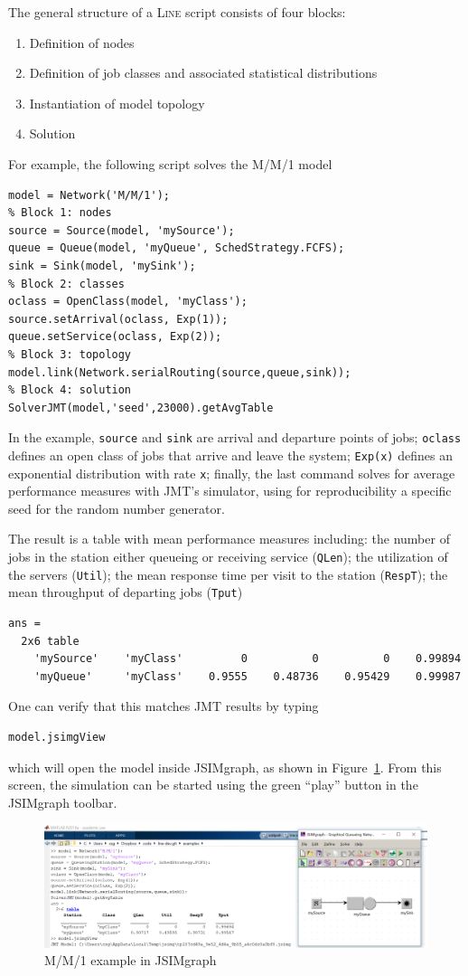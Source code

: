 The general structure of a \textsc{Line} script consists of four blocks:
\begin{enumerate}
\item Definition of nodes
\item Definition of job classes and associated statistical distributions
\item Instantiation of model topology
\item Solution
\end{enumerate}
For example, the following script solves the M/M/1 model
\begin{lstlisting}
model = Network('M/M/1');
% Block 1: nodes
source = Source(model, 'mySource');
queue = Queue(model, 'myQueue', SchedStrategy.FCFS);
sink = Sink(model, 'mySink');
% Block 2: classes
oclass = OpenClass(model, 'myClass');
source.setArrival(oclass, Exp(1));
queue.setService(oclass, Exp(2));
% Block 3: topology
model.link(Network.serialRouting(source,queue,sink));
% Block 4: solution
SolverJMT(model,'seed',23000).getAvgTable
\end{lstlisting}
In the example, \texttt{source} and \texttt{sink} are arrival and departure points of jobs; \texttt{oclass} defines an open class of jobs that arrive and leave the system; \texttt{Exp(x)} defines an exponential distribution with rate \texttt{x}; finally, the last command solves for average performance measures with JMT's simulator, using for reproducibility a specific seed for the random number generator.

The result is a table with mean performance measures including: the number of jobs in the station either queueing or receiving service (\texttt{QLen}); the utilization of the servers (\texttt{Util}); the mean response time per visit to the station (\texttt{RespT}); the mean throughput of departing jobs (\texttt{Tput})
\begin{lstlisting}
ans =
  2x6 table
    'mySource'    'myClass'         0          0          0    0.99894
    'myQueue'     'myClass'    0.9555    0.48736    0.95429    0.99987
\end{lstlisting}
One can verify that this matches JMT results by typing
\begin{lstlisting}
model.jsimgView
\end{lstlisting}
which will open the model inside JSIMgraph, as shown in Figure~\ref{FIG:jsimgViewMM1}. From this screen, the simulation can be started using the green ``play'' button in the JSIMgraph toolbar.
\begin{figure}[ht!]
  \centering
  \includegraphics[width=14cm]{./images/jsimgViewMM1.png}
  \caption{M/M/1 example in JSIMgraph}\label{FIG:jsimgViewMM1}
\end{figure}

